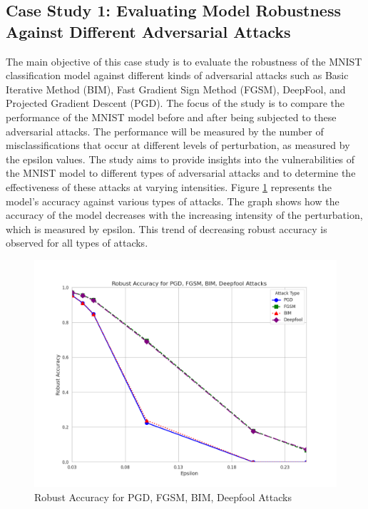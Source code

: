 \documentclass[10pt, conference, a4paper, final]{IEEEtran}
\begin{document}
\subsection{Case Study 1: Evaluating Model Robustness Against Different Adversarial Attacks}
The main objective of this case study is to evaluate the robustness of the MNIST classification model 
against different kinds of adversarial attacks such as Basic Iterative Method (BIM), Fast Gradient Sign Method (FGSM), 
DeepFool, and Projected Gradient Descent (PGD). The focus of the study is to compare the performance of the MNIST model
before and after being subjected to these adversarial attacks. The performance will be measured by the number of misclassifications
that occur at different levels of perturbation, as measured by the epsilon values. The study aims to provide insights into the
vulnerabilities of the MNIST model to different types of adversarial attacks and to determine the effectiveness of these attacks 
at varying intensities. Figure \ref {fig:robust_accuracy_attacks} represents the model's accuracy against various types of attacks. 
The graph shows how the accuracy of the model decreases with the increasing intensity of the perturbation, which is measured by epsilon.
This trend of decreasing robust accuracy is observed for all types of attacks.



\begin{figure}[ht]
    \centering
    \includegraphics[width=\linewidth]{paper_images/robust.png}
    \caption{Robust Accuracy for PGD, FGSM, BIM, Deepfool Attacks}
    \label{fig:robust_accuracy_attacks}
\end{figure}
\end{document}
